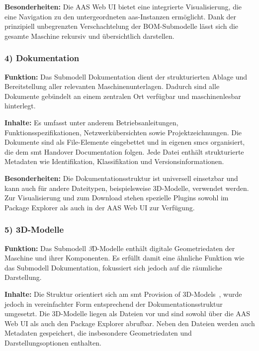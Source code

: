 \textbf{Besonderheiten:}  
Die AAS Web UI bietet eine integrierte Visualisierung, die eine Navigation zu den untergeordneten \acs{aas}-Instanzen ermöglicht.  
Dank der prinzipiell unbegrenzten Verschachtelung der BOM-Submodelle lässt sich die gesamte Maschine rekursiv und übersichtlich darstellen.

\subsubsection*{4) Dokumentation}
\vspace{-0.5em}
\textbf{Funktion:}  
Das Submodell Dokumentation dient der strukturierten Ablage und Bereitstellung aller relevanten Maschinenunterlagen.  
Dadurch sind alle Dokumente gebündelt an einem zentralen Ort verfügbar und maschinenlesbar hinterlegt.

\textbf{Inhalte:}  
Es umfasst unter anderem Betriebsanleitungen, Funktionsspezifikationen, Netzwerkübersichten sowie Projektzeichnungen.  
Die Dokumente sind als File-Elemente eingebettet und in eigenen \acsp{smc} organisiert, die dem \acs{smt} Handover Documentation \cite{SpezifikationDokumentation} folgen.  
Jede Datei enthält strukturierte Metadaten wie Identifikation, Klassifikation und Versionsinformationen.

\textbf{Besonderheiten:}  
Die Dokumentationsstruktur ist universell einsetzbar und kann auch für andere Dateitypen, beispielsweise 3D-Modelle, verwendet werden.  
Zur Visualisierung und zum Download stehen spezielle Plugins sowohl im Package Explorer als auch in der AAS Web UI zur Verfügung.

\subsubsection*{5) 3D-Modelle}
\vspace{-0.5em}
\textbf{Funktion:}  
Das Submodell \textit3D-Modelle enthält digitale Geometriedaten der Maschine und ihrer Komponenten.  
Es erfüllt damit eine ähnliche Funktion wie das Submodell Dokumentation, fokussiert sich jedoch auf die räumliche Darstellung.

\textbf{Inhalte:}  
Die Struktur orientiert sich am \acs{smt} Provision of 3D-Models~\cite{Spezifikation3DModelle}, wurde jedoch in vereinfachter Form entsprechend der Dokumentationsstruktur umgesetzt.  
Die 3D-Modelle liegen als Dateien vor und sind sowohl über die AAS Web UI als auch den Package Explorer abrufbar.  
Neben den Dateien werden auch Metadaten gespeichert, die insbesondere Geometriedaten und Darstellungsoptionen enthalten.

